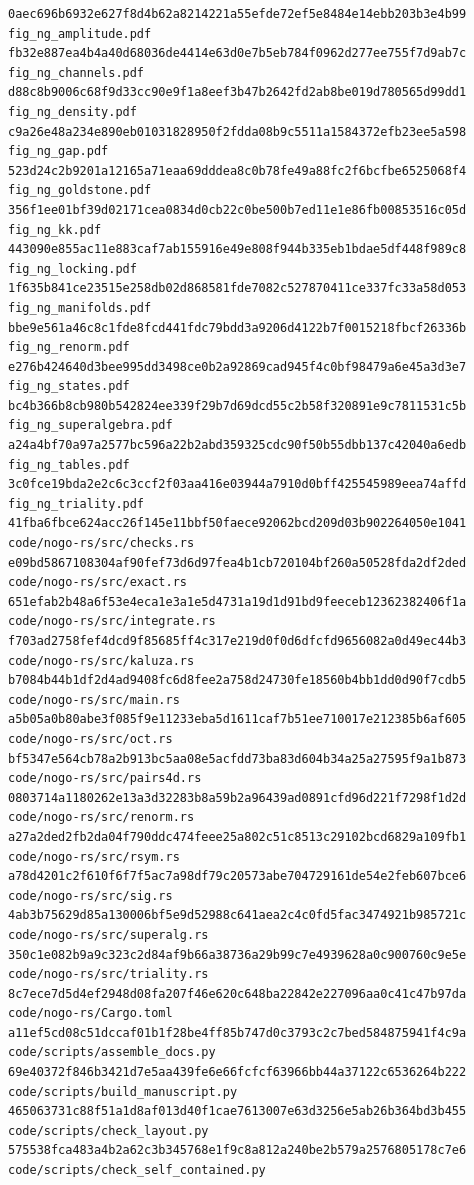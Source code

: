\documentclass[
  10pt,
]{article}
\begin{document}
\begin{verbatim}
0aec696b6932e627f8d4b62a8214221a55efde72ef5e8484e14ebb203b3e4b99  fig_ng_amplitude.pdf
fb32e887ea4b4a40d68036de4414e63d0e7b5eb784f0962d277ee755f7d9ab7c  fig_ng_channels.pdf
d88c8b9006c68f9d33cc90e9f1a8eef3b47b2642fd2ab8be019d780565d99dd1  fig_ng_density.pdf
c9a26e48a234e890eb01031828950f2fdda08b9c5511a1584372efb23ee5a598  fig_ng_gap.pdf
523d24c2b9201a12165a71eaa69dddea8c0b78fe49a88fc2f6bcfbe6525068f4  fig_ng_goldstone.pdf
356f1ee01bf39d02171cea0834d0cb22c0be500b7ed11e1e86fb00853516c05d  fig_ng_kk.pdf
443090e855ac11e883caf7ab155916e49e808f944b335eb1bdae5df448f989c8  fig_ng_locking.pdf
1f635b841ce23515e258db02d868581fde7082c527870411ce337fc33a58d053  fig_ng_manifolds.pdf
bbe9e561a46c8c1fde8fcd441fdc79bdd3a9206d4122b7f0015218fbcf26336b  fig_ng_renorm.pdf
e276b424640d3bee995dd3498ce0b2a92869cad945f4c0bf98479a6e45a3d3e7  fig_ng_states.pdf
bc4b366b8cb980b542824ee339f29b7d69dcd55c2b58f320891e9c7811531c5b  fig_ng_superalgebra.pdf
a24a4bf70a97a2577bc596a22b2abd359325cdc90f50b55dbb137c42040a6edb  fig_ng_tables.pdf
3c0fce19bda2e2c6c3ccf2f03aa416e03944a7910d0bff425545989eea74affd  fig_ng_triality.pdf
41fba6fbce624acc26f145e11bbf50faece92062bcd209d03b902264050e1041  code/nogo-rs/src/checks.rs
e09bd5867108304af90fef73d6d97fea4b1cb720104bf260a50528fda2df2ded  code/nogo-rs/src/exact.rs
651efab2b48a6f53e4eca1e3a1e5d4731a19d1d91bd9feeceb12362382406f1a  code/nogo-rs/src/integrate.rs
f703ad2758fef4dcd9f85685ff4c317e219d0f0d6dfcfd9656082a0d49ec44b3  code/nogo-rs/src/kaluza.rs
b7084b44b1df2d4ad9408fc6d8fee2a758d24730fe18560b4bb1dd0d90f7cdb5  code/nogo-rs/src/main.rs
a5b05a0b80abe3f085f9e11233eba5d1611caf7b51ee710017e212385b6af605  code/nogo-rs/src/oct.rs
bf5347e564cb78a2b913bc5aa08e5acfdd73ba83d604b34a25a27595f9a1b873  code/nogo-rs/src/pairs4d.rs
0803714a1180262e13a3d32283b8a59b2a96439ad0891cfd96d221f7298f1d2d  code/nogo-rs/src/renorm.rs
a27a2ded2fb2da04f790ddc474feee25a802c51c8513c29102bcd6829a109fb1  code/nogo-rs/src/rsym.rs
a78d4201c2f610f6f7f5ac7a98df79c20573abe704729161de54e2feb607bce6  code/nogo-rs/src/sig.rs
4ab3b75629d85a130006bf5e9d52988c641aea2c4c0fd5fac3474921b985721c  code/nogo-rs/src/superalg.rs
350c1e082b9a9c323c2d84af9b66a38736a29b99c7e4939628a0c900760c9e5e  code/nogo-rs/src/triality.rs
8c7ece7d5d4ef2948d08fa207f46e620c648ba22842e227096aa0c41c47b97da  code/nogo-rs/Cargo.toml
a11ef5cd08c51dccaf01b1f28be4ff85b747d0c3793c2c7bed584875941f4c9a  code/scripts/assemble_docs.py
69e40372f846b3421d7e5aa439fe6e66fcfcf63966bb44a37122c6536264b222  code/scripts/build_manuscript.py
465063731c88f51a1d8af013d40f1cae7613007e63d3256e5ab26b364bd3b455  code/scripts/check_layout.py
575538fca483a4b2a62c3b345768e1f9c8a812a240be2b579a2576805178c7e6  code/scripts/check_self_contained.py

\end{verbatim}
\end{document}
